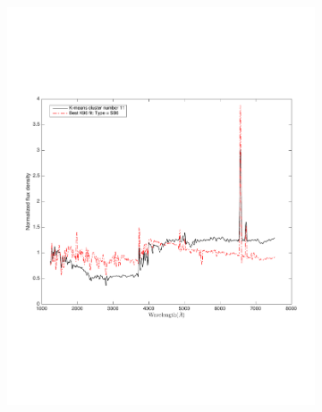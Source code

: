 \begin{figure}
                \begin{subfigure}[b]{0.49\textwidth}
                    \centering
                  \includegraphics[width=.99\textwidth]{k_means_images/max_cosine2.pdf}
                \end{subfigure}
                \hfill
                \begin{subfigure}[b]{0.49\textwidth}

\end{subfigure}
\end{figure}
